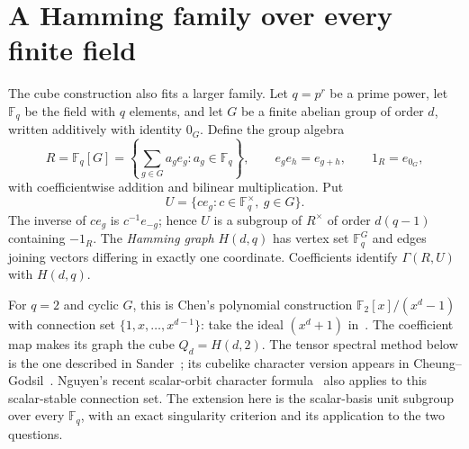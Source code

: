 \documentclass[10pt]{article}
\newcommand{\F}{\mathbb F}
\begin{document}
\section{A Hamming family over every finite field}
The cube construction also fits a larger family. Let $q=p^r$ be a
prime power, let $\F_q$ be the field with $q$ elements, and let $G$
be a finite abelian group of order $d$, written additively with identity
$0_G$. Define the group algebra
\[
 R=\F_q[G]=\left\{\sum_{g\in G}a_g e_g:a_g\in\F_q\right\},
 \qquad e_g e_h=e_{g+h},\qquad 1_R=e_{0_G},
\]
with coefficientwise addition and bilinear multiplication. Put
\[
 U=\{c e_g:c\in\F_q^\times,\ g\in G\}.
\]
The inverse of $ce_g$ is $c^{-1}e_{-g}$; hence $U$ is a subgroup of
$R^\times$ of order $d(q-1)$ containing $-1_R$.
The \emph{Hamming graph} $H(d,q)$ has vertex set $\F_q^G$ and
edges joining vectors differing in exactly one coordinate. Coefficients
identify $\Gamma(R,U)$ with $H(d,q)$.

For $q=2$ and cyclic $G$, this is Chen's polynomial construction
$\F_2[x]/(x^d-1)$ with connection set $\{1,x,\ldots,x^{d-1}\}$:
take the ideal $(x^d+1)$ in~\cite[Section 2, equation (4), p.~5]{Chen}.
The coefficient map makes its graph the cube $Q_d=H(d,2)$.
The tensor spectral method below is the one described in
Sander~\cite[Theorem 2.2 and Lemma 3.1]{Sander}; its cubelike
character version appears in Cheung--Godsil~\cite[Section 3]{CG}.
Nguyen's recent scalar-orbit character formula~\cite[Proposition 2.2]{Matrix}
also applies to this scalar-stable connection set.
The extension here is the scalar-basis unit subgroup over every
$\F_q$, with an exact singularity criterion and its application
to the two questions.
\end{document}
